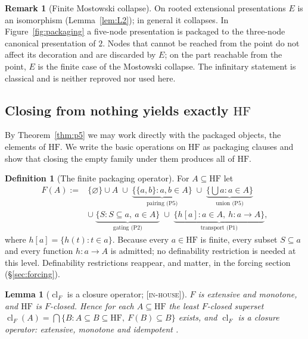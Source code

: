 \documentclass[11pt]{article}
\newcommand{\HF}{\mathrm{HF}}                 \newcommand{\rank}{\operatorname{rank}}
\newcommand{\clF}{\operatorname{cl}_F}
\newcommand{\gradetag}[1]{\textnormal{\textsc{[#1]}}}
\newcommand{\inhouse}{\gradetag{in-house}}
\newtheorem{lemma}[theorem]{Lemma}
\theoremstyle{definition}
\newtheorem{definition}[theorem]{Definition}
\newtheorem{remark}[theorem]{Remark}
\begin{document}
\begin{remark}[Finite Mostowski collapse]\label{rem:finitemostowski}
On rooted extensional presentations $E$ is an isomorphism (Lemma~\ref{lem:L2}); in general it
collapses. In Figure~\ref{fig:packaging} a five-node presentation is packaged to the three-node
canonical presentation of $2$. Nodes that cannot be reached from the point do not affect its
decoration and are discarded by $E$; on the part reachable from the point, $E$ is the finite case
of the Mostowski collapse. The infinitary statement is classical and is neither reproved nor used
here.
\end{remark}

\subsection{Closing from nothing yields exactly \texorpdfstring{$\HF$}{HF}}\label{ssec:hf}

By Theorem~\ref{thm:p5} we may work directly with the packaged objects, the elements of $\HF$. We
write the basic operations on $\HF$ as packaging clauses and show that closing the empty family
under them produces all of $\HF$.

\begin{definition}[The finite packaging operator]\label{def:F}
For $A\subseteq\HF$ let
\[
  \begin{aligned}
  F(A):={}&\{\varnothing\}\cup A
  \;\cup\;\underbrace{\{\{a,b\}:a,b\in A\}}_{\text{pairing (P5)}}
  \;\cup\;\underbrace{\{\textstyle\bigcup a:a\in A\}}_{\text{union (P5)}}\\
  &\cup\;\underbrace{\{S:S\subseteq a,\ a\in A\}}_{\text{gating (P2)}}
  \;\cup\;\underbrace{\{h[a]:a\in A,\ h\colon a\to A\}}_{\text{transport (P1)}},
  \end{aligned}
\]
where $h[a]=\{h(t):t\in a\}$. Because every $a\in\HF$ is finite, every subset $S\subseteq a$ and
every function $h\colon a\to A$ is admitted; no definability restriction is needed at this level.
Definability restrictions reappear, and matter, in the forcing section (\S\ref{sec:forcing}).
\end{definition}

\begin{lemma}[$\clF$ is a closure operator; \inhouse]\label{lem:closure}
$F$ is extensive and monotone, and $\HF$ is $F$-closed. Hence for each $A\subseteq\HF$ the least
$F$-closed superset $\clF(A)=\bigcap\{B: A\subseteq B\subseteq\HF,\ F(B)\subseteq B\}$ exists,
and $\clF$ is a closure operator: extensive, monotone and idempotent
\citep{DaveyPriestley2002,Tarski1955}.
\end{lemma}
\end{document}
